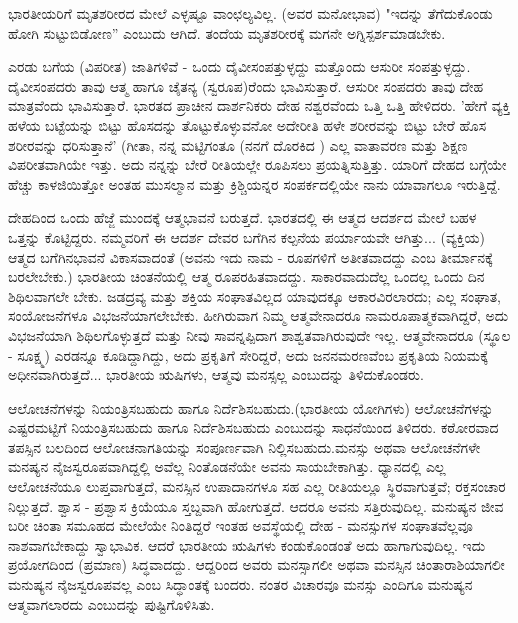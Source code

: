ಭಾರತೀಯರಿಗೆ ಮೃತಶರೀರದ ಮೇಲೆ ಎಳ್ಳಷ್ಟೂ ವಾಂಛಲ್ಯವಿಲ್ಲ. (ಅವರ ಮನೋಭಾವ) "ಇದನ್ನು ತೆಗೆದುಕೊಂಡು ಹೋಗಿ ಸುಟ್ಟುಬಿಡೋಣ'' ಎಂಬುದು ಆಗಿದೆ. ತಂದೆಯ ಮೃತಶರೀರಕ್ಕೆ ಮಗನೇ ಅಗ್ನಿಸ್ಪರ್ಶಮಾಡಬೇಕು.

ಎರಡು ಬಗೆಯ (ವಿಪರೀತ) ಜಾತಿಗಳಿವೆ - ಒಂದು ದೈವೀಸಂಪತ್ತುಳ್ಳದ್ದು ಮತ್ತೊಂದು ಆಸುರೀ ಸಂಪತ್ತುಳ್ಳದ್ದು. ದೈವೀಸಂಪದರು ತಾವು ಆತ್ಮ ಹಾಗೂ ಚೈತನ್ಯ (ಸ್ವರೂಪ)ರೆಂದು ಭಾವಿಸುತ್ತಾರೆ. ಆಸುರೀ ಸಂಪದರು ತಾವು ದೇಹ ಮಾತ್ರವೆಂದು ಭಾವಿಸುತ್ತಾರೆ. ಭಾರತದ ಪ್ರಾಚೀನ ದಾರ್ಶನಿಕರು ದೇಹ ನಶ್ವರವೆಂದು ಒತ್ತಿ ಒತ್ತಿ ಹೇಳಿದರು. 'ಹೇಗೆ ವ್ಯಕ್ತಿ ಹಳೆಯ ಬಟ್ಟೆಯನ್ನು ಬಿಟ್ಟು ಹೊಸದನ್ನು ತೊಟ್ಟುಕೊಳ್ಳುವನೋ ಅದೇರೀತಿ ಹಳೇ ಶರೀರವನ್ನು ಬಿಟ್ಟು ಬೇರೆ ಹೊಸ ಶರೀರವನ್ನು ಧರಿಸುತ್ತಾನೆ' (ಗೀತಾ,  ನನ್ನ ಮಟ್ಟಿಗಂತೂ (ನನಗೆ ದೊರಕಿದ ) ಎಲ್ಲ ವಾತಾವರಣ ಮತ್ತು ಶಿಕ್ಷಣ ವಿಪರೀತವಾಗಿಯೇ ಇತ್ತು. ಅದು ನನ್ನನ್ನು ಬೇರೆ ರೀತಿಯಲ್ಲೇ ರೂಪಿಸಲು ಪ್ರಯತ್ನಿಸುತ್ತಿತ್ತು. ಯಾರಿಗೆ ದೇಹದ ಬಗ್ಗೆಯೇ ಹೆಚ್ಚು ಕಾಳಜಿಯಿತ್ತೋ ಅಂತಹ ಮುಸಲ್ಮಾನ ಮತ್ತು ಕ್ರಿಶ್ಚಿಯನ್ನರ ಸಂಪರ್ಕದಲ್ಲಿಯೇ ನಾನು ಯಾವಾಗಲೂ ಇರುತ್ತಿದ್ದೆ.

ದೇಹದಿಂದ ಒಂದು ಹೆಜ್ಜೆ ಮುಂದಕ್ಕೆ ಆತ್ಮಭಾವನೆ ಬರುತ್ತದೆ. ಭಾರತದಲ್ಲಿ ಈ ಆತ್ಮದ ಆದರ್ಶದ ಮೇಲೆ ಬಹಳ ಒತ್ತನ್ನು ಕೊಟ್ಟಿದ್ದರು. ನಮ್ಮವರಿಗೆ ಈ ಆದರ್ಶ ದೇವರ ಬಗೆಗಿನ ಕಲ್ಪನೆಯ ಪರ್ಯಾಯವೇ ಆಗಿತ್ತು... (ವ್ಯಕ್ತಿಯ) ಆತ್ಮದ ಬಗೆಗಿನ\break ಭಾವನೆ ವಿಕಾಸವಾದಂತೆ (ಅವನು ಇದು ನಾಮ - ರೂಪಗಳಿಗೆ ಅತೀತವಾದದ್ದು ಎಂಬ ತೀರ್ಮಾನಕ್ಕೆ ಬರಲೇಬೇಕು.) ಭಾರತೀಯ ಚಿಂತನೆಯಲ್ಲಿ ಆತ್ಮ ರೂಪರಹಿತವಾದದ್ದು. ಸಾಕಾರವಾದುದೆಲ್ಲ ಒಂದಲ್ಲ ಒಂದು ದಿನ ಶಿಥಿಲವಾಗಲೇ ಬೇಕು. ಜಡದ್ರವ್ಯ ಮತ್ತು ಶಕ್ತಿಯ ಸಂಘಾತವಿಲ್ಲದ ಯಾವುದಕ್ಕೂ ಆಕಾರವಿರಲಾರದು; ಎಲ್ಲ ಸಂಘಾತ, ಸಂಯೋಜನೆಗಳೂ ವಿಭಜನೆಯಾಗಲೇಬೇಕು. ಹೀಗಿರುವಾಗ ನಿಮ್ಮ ಆತ್ಮವೇನಾದರೂ ನಾಮರೂಪಾತ್ಮಕವಾಗಿದ್ದರೆ, ಅದು ವಿಭಜನೆಯಾಗಿ ಶಿಥಿಲಗೊಳ್ಳುತ್ತದೆ ಮತ್ತು ನೀವು ಸಾವನ್ನಪ್ಪಿದಾಗ ಶಾಶ್ವತವಾಗಿರುವುದೇ ಇಲ್ಲ. ಆತ್ಮವೇನಾದರೂ (ಸ್ಥೂಲ - ಸೂಕ್ಷ್ಮ) ಎರಡನ್ನೂ ಕೂಡಿದ್ದಾಗಿದ್ದು, ಅದು ಪ್ರಕೃತಿಗೆ ಸೇರಿದ್ದರೆ, ಅದು ಜನನಮರಣವೆಂಬ ಪ್ರಕೃತಿಯ ನಿಯಮಕ್ಕೆ ಅಧೀನವಾಗಿರುತ್ತದೆ... ಭಾರತೀಯ ಋಷಿಗಳು, ಆತ್ಮವು ಮನಸ್ಸಲ್ಲ ಎಂಬುದನ್ನು ತಿಳಿದುಕೊಂಡರು.

ಆಲೋಚನೆಗಳನ್ನು ನಿಯಂತ್ರಿಸಬಹುದು ಹಾಗೂ ನಿರ್ದೆಶಿಸಬಹುದು.\break (ಭಾರತೀಯ ಯೋಗಿಗಳು) ಆಲೋಚನೆಗಳನ್ನು ಎಷ್ಟರಮಟ್ಟಿಗೆ ನಿಯಂತ್ರಿಸಬಹುದು ಹಾಗೂ ನಿರ್ದೆಶಿಸಬಹುದು ಎಂಬುದನ್ನು ಸಾಧನೆಯಿಂದ ತಿಳಿದರು. ಕಠೋರವಾದ ತಪಸ್ಸಿನ ಬಲದಿಂದ ಆಲೋಚನಾಗತಿಯನ್ನು ಸಂಪೂರ್ಣವಾಗಿ ನಿಲ್ಲಿಸಬಹುದು.\break ಮನಸ್ಸು ಅಥವಾ ಆಲೋಚನೆಗಳೇ ಮನಷ್ಯನ ನೈಜಸ್ವರೂಪವಾಗಿದ್ದಲ್ಲಿ ಅವೆಲ್ಲ ನಿಂತೊಡನೆಯೇ ಅವನು ಸಾಯಬೇಕಾಗಿತ್ತು. ಧ್ಯಾನದಲ್ಲಿ ಎಲ್ಲ ಆಲೋಚನೆಯೂ ಲುಪ್ತವಾಗುತ್ತದೆ, ಮನಸ್ಸಿನ ಉಪಾದಾನಗಳೂ ಸಹ ಎಲ್ಲ ರೀತಿಯಲ್ಲೂ ಸ್ಥಿರವಾಗುತ್ತವೆ; ರಕ್ತಸಂಚಾರ ನಿಲ್ಲುತ್ತದೆ. ಶ್ವಾಸ - ಪ್ರಶ್ವಾಸ ಕ್ರಿಯೆಯೂ ಸ್ತಬ್ದವಾಗಿ ಹೋಗುತ್ತದೆ. ಆದರೂ ಅವನು ಸತ್ತಿರುವುದಿಲ್ಲ. ಮನುಷ್ಯನ ಜೀವ ಬರೀ ಚಿಂತಾ ಸಮೂಹದ ಮೇಲೆಯೇ ನಿಂತಿದ್ದರೆ ಇಂತಹ ಅವಸ್ಥೆಯಲ್ಲಿ ದೇಹ - ಮನಸ್ಸುಗಳ ಸಂಘಾತವೆಲ್ಲವೂ ನಾಶವಾಗಬೇಕಾದ್ದು ಸ್ವಾಭಾವಿಕ. ಆದರೆ ಭಾರತೀಯ ಋಷಿಗಳು ಕಂಡುಕೊಂಡಂತೆ ಅದು ಹಾಗಾಗುವುದಿಲ್ಲ. ಇದು ಪ್ರಯೋಗದಿಂದ (ಪ್ರಮಾಣ) ಸಿದ್ಧವಾದದ್ದು. ಆದ್ದರಿಂದ ಅವರು ಮನಸ್ಸಾಗಲೀ ಅಥವಾ ಮನಸ್ಸಿನ ಚಿಂತಾರಾಶಿಯಾಗಲೀ ಮನುಷ್ಯನ ನೈಜಸ್ವರೂಪವಲ್ಲ ಎಂಬ ಸಿದ್ಧಾಂತಕ್ಕೆ ಬಂದರು. ನಂತರ ವಿಚಾರವೂ ಮನಸ್ಸು ಎಂದಿಗೂ ಮನುಷ್ಯನ ಆತ್ಮವಾಗಲಾರದು ಎಂಬುದನ್ನು ಪುಷ್ಟಿಗೊಳಿಸಿತು.

